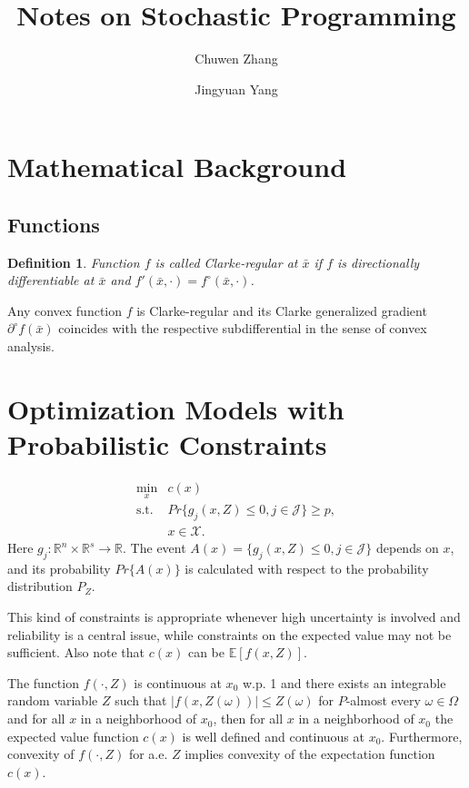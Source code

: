 \documentclass[a4pper,11pt]{article}
\title{Notes on Stochastic Programming}
\newtheorem{defn}{Definition}[section]
\begin{document}
\author[1]{\small Chuwen Zhang}
\author[1]{\small Jingyuan Yang}
\maketitle

\section{Mathematical Background}
\subsection{Functions}
\begin{defn}
    Function $f$ is called Clarke-regular at $\bar x$ if $f$ is directionally differentiable at $\bar x$ and $f'(\bar x,\cdot)=f^\circ (\bar x,\cdot)$.
\end{defn}
Any convex function $f$ is Clarke-regular and its Clarke generalized gradient $\partial^\circ f(\bar x)$ coincides with the respective subdifferential in the sense of convex analysis.
\section{Optimization Models with Probabilistic Constraints}
\begin{equation}
    \label{4.1}
    \begin{array}{ll}
        \min_x      & c(x)                                        \\
        \text{s.t.} & Pr\{g_j(x,Z)\leq 0,j\in \mathcal J\}\geq p, \\
                    & x\in \mathcal X.
    \end{array}
\end{equation}
Here $g_j:\mathbb R^n\times \mathbb R^s\to \mathbb R$. The event $A(x)=\{g_j(x,Z)\leq 0,j\in \mathcal J\}$ depends on $x$, and its probability $Pr\{A(x)\}$ is calculated with respect to the probability distribution $P_Z$.

This kind of constraints is appropriate whenever high uncertainty is involved and reliability is a central issue, while constraints on the expected value may not be sufficient. Also note that $c(x)$ can be $\mathbb E[f(x,Z)]$.

The function $f(\cdot,Z)$ is continuous at $x_0$ w.p. 1 and there exists an integrable random variable $Z$ such that $|f (x, Z(\omega))|\leq  Z(\omega)$ for $P$-almost every $\omega\in \Omega$ and for all $x$ in a neighborhood of $x_0$, then for all $x$ in a neighborhood of $x_0$ the expected value function $c(x)$ is well deﬁned and continuous at $x_0$. Furthermore, convexity of $f (\cdot, Z)$ for a.e. $Z$ implies convexity of the expectation function $c(x)$.
\end{document}
